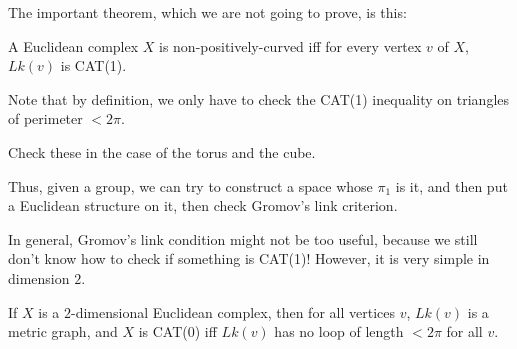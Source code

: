 \documentclass[a4paper]{article}
\begin{document}
The important theorem, which we are not going to prove, is this:
\begin{thm}
  A Euclidean complex $X$ is non-positively-curved iff for every vertex $v$ of $X$, $Lk(v)$ is CAT(1).
\end{thm}
Note that by definition, we only have to check the CAT(1) inequality on triangles of perimeter $< 2\pi$.

\begin{ex}
  Check these in the case of the torus and the cube.
\end{ex}

Thus, given a group, we can try to construct a space whose $\pi_1$ is it, and then put a Euclidean structure on it, then check Gromov's link criterion.

In general, Gromov's link condition might not be too useful, because we still don't know how to check if something is CAT(1)! However, it is very simple in dimension $2$.

\begin{cor}
  If $X$ is a $2$-dimensional Euclidean complex, then for all vertices $v$, $Lk(v)$ is a metric graph, and $X$ is CAT(0) iff $Lk(v)$ has no loop of length $< 2\pi$ for all $v$.
\end{cor}
\end{document}
